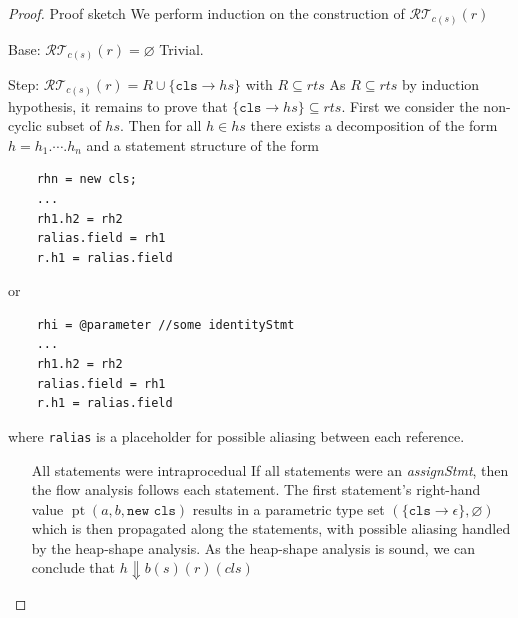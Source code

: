 \begin{proof}{Proof sketch}
We perform induction on the construction of $\mathcal{RT}_{c(s)}(r)$
\begin{case}
    \item[Base: $\mathcal{RT}_{c(s)}(r) = \varnothing$] Trivial.
    \item[Step: $\mathcal{RT}_{c(s)}(r) = R \cup \{ \texttt{cls} \to hs \}$ with $R \subseteq \mathit{rts}$] As $R \subseteq \mathit{rts}$ by induction hypothesis, it remains to prove that $\{ \texttt{cls} \to hs \} \subseteq \mathit{rts}$. First we consider the non-cyclic subset of $hs$. Then for all $h \in hs$ there exists a decomposition of the form $h=h_1.\cdots.h_n$ and a statement structure of the form
    \begin{verbatim}
    rhn = new cls;
    ...
    rh1.h2 = rh2
    ralias.field = rh1
    r.h1 = ralias.field
    \end{verbatim}
    or
    \begin{verbatim}
    rhi = @parameter //some identityStmt
    ...
    rh1.h2 = rh2
    ralias.field = rh1
    r.h1 = ralias.field
    \end{verbatim}
    where \texttt{ralias} is a placeholder for possible aliasing between each reference.
    \begin{enumerate}[label=\textbf{Case 2.\arabic*:},itemindent=*]
        \item[All statements were intraprocedual]
        If all statements were an \emph{assignStmt}, then the flow analysis follows each statement. The first statement's right-hand value $\operatorname{pt}(a,b,\texttt{new cls})$ results in a parametric type set $(\{ \texttt{cls} \to \epsilon \}, \varnothing)$ which is then propagated along the statements, with possible aliasing handled by the heap-shape analysis. As the heap-shape analysis is sound, we can conclude that $h \Downarrow b(s)(r)(cls)$
        

\end{enumerate}
\end{case}
\end{proof}
